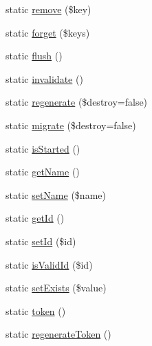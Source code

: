 \begin{DoxyCompactItemize}
\item 
static \mbox{\hyperlink{class_illuminate_1_1_support_1_1_facades_1_1_session_aee1f089bbab96140190984fe699cb372}{remove}} (\$key)
\item 
static \mbox{\hyperlink{class_illuminate_1_1_support_1_1_facades_1_1_session_afb75b31386d178d45b3f26a377d6f812}{forget}} (\$keys)
\item 
static \mbox{\hyperlink{class_illuminate_1_1_support_1_1_facades_1_1_session_adf09e906bbec7a8ec176f9bd0e8d601b}{flush}} ()
\item 
static \mbox{\hyperlink{class_illuminate_1_1_support_1_1_facades_1_1_session_a0f486f746febaa945d0c816ec680a40b}{invalidate}} ()
\item 
static \mbox{\hyperlink{class_illuminate_1_1_support_1_1_facades_1_1_session_ac2024d830b7916f89cdcb76b63b2496a}{regenerate}} (\$destroy=false)
\item 
static \mbox{\hyperlink{class_illuminate_1_1_support_1_1_facades_1_1_session_a8ae6a969389f7bd5a9a237446f94a280}{migrate}} (\$destroy=false)
\item 
static \mbox{\hyperlink{class_illuminate_1_1_support_1_1_facades_1_1_session_a4fc46bbca67d4b429dec93e315a1fbbb}{is\+Started}} ()
\item 
static \mbox{\hyperlink{class_illuminate_1_1_support_1_1_facades_1_1_session_a6b79f32fe74f5d416c0b00c0349507e2}{get\+Name}} ()
\item 
static \mbox{\hyperlink{class_illuminate_1_1_support_1_1_facades_1_1_session_ad9d0cf14604bfebb043ca7c212f70308}{set\+Name}} (\$name)
\item 
static \mbox{\hyperlink{class_illuminate_1_1_support_1_1_facades_1_1_session_adcd14ba99ec3702160ee898edf08abf6}{get\+Id}} ()
\item 
static \mbox{\hyperlink{class_illuminate_1_1_support_1_1_facades_1_1_session_af75e2503069c77ffd548d8f3d5c952d7}{set\+Id}} (\$id)
\item 
static \mbox{\hyperlink{class_illuminate_1_1_support_1_1_facades_1_1_session_a3234e0b53fd5c9792f5a5909e891b2db}{is\+Valid\+Id}} (\$id)
\item 
static \mbox{\hyperlink{class_illuminate_1_1_support_1_1_facades_1_1_session_a440918b19ecd6455272268fc9d7d2793}{set\+Exists}} (\$value)
\item 
static \mbox{\hyperlink{class_illuminate_1_1_support_1_1_facades_1_1_session_a48311bac3e8b34fdcd461416128ba348}{token}} ()
\item 
static \mbox{\hyperlink{class_illuminate_1_1_support_1_1_facades_1_1_session_a1782f18f9ba0d93b7dd7058a39423c82}{regenerate\+Token}} ()

\end{DoxyCompactItemize}

